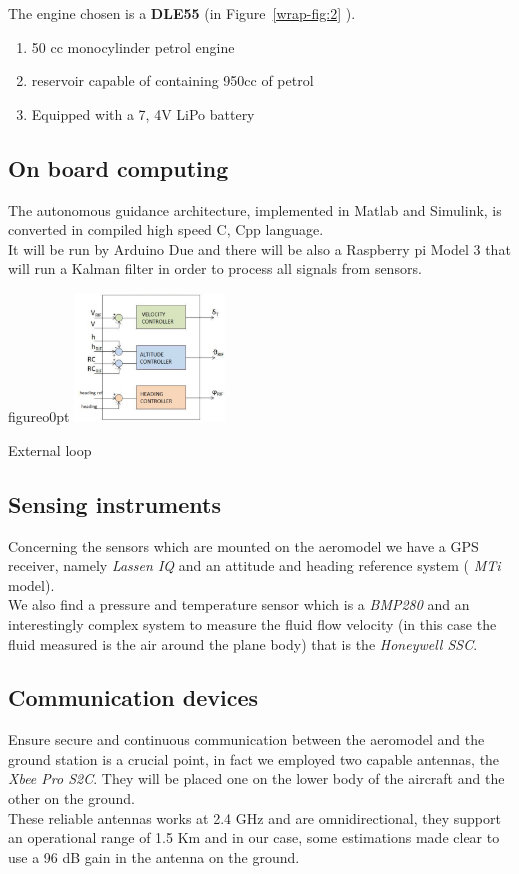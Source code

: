 \documentclass[oneside,onecolumn]{article}
\begin{document}
The engine chosen is a \textbf{DLE55} (in Figure~\ref{wrap-fig:2} ).
\begin{enumerate}
\item 50 cc monocylinder petrol engine
\item reservoir capable of containing 950cc of petrol
\item Equipped with a 7, 4V LiPo battery
\end{enumerate}


\subsection{On board computing}
The autonomous guidance architecture, implemented in Matlab and Simulink, is
converted in compiled high speed C, Cpp language.\\ It will be run by Arduino Due
and there will be also a Raspberry pi Model 3 that will run a Kalman filter in
order to process all signals from sensors.


\begin{wrapfloat}{figure}{o}{0pt}
  \includegraphics[width=0.3\textwidth]{extLoop}
  \caption{External loop}\label{wrap-fig:3}
\end{wrapfloat} 



\subsection{Sensing instruments}
Concerning the sensors which are mounted on the aeromodel we have a GPS
receiver, namely \textit{ Lassen IQ} and an attitude and heading reference
system ( \textit{MTi} model).\\
We also find a pressure and temperature sensor which is a \textit{BMP280} and an
interestingly complex system to measure the fluid flow velocity (in this case the
fluid measured is the air around the plane body) that is the \textit{Honeywell SSC}.
\subsection{Communication devices}
Ensure secure and continuous communication between the aeromodel and the ground
station is a crucial point, in fact we employed two capable antennas, the
\textit{Xbee Pro S2C}. They will be placed one on the lower body of the aircraft
and the other on the ground.\\
These reliable antennas works at 2.4 GHz and are omnidirectional, they support
an operational range of 1.5 Km and in our case, some estimations made clear to
use a 96 dB gain in the antenna on the ground.
\end{document}

